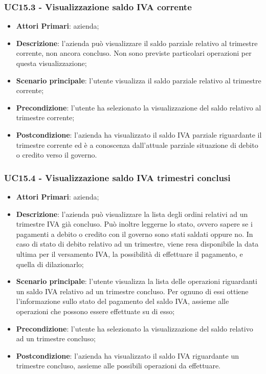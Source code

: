 \subsubsection{UC15.3 - Visualizzazione saldo IVA corrente}
\begin{itemize}
	\item \textbf{Attori Primari}: azienda;
	\item \textbf{Descrizione}: l'azienda può visualizzare il saldo parziale relativo al trimestre corrente, non ancora concluso. Non sono previste particolari operazioni per questa visualizzazione;
	\item \textbf{Scenario principale}: l'utente visualizza il saldo parziale relativo al trimestre corrente;
	\item \textbf{Precondizione}: l'utente ha selezionato la visualizzazione del saldo relativo al trimestre corrente;
	\item \textbf{Postcondizione}: l'azienda ha visualizzato il saldo IVA parziale riguardante il trimestre corrente ed è a conoscenza dall'attuale parziale situazione di debito o credito verso il governo.
\end{itemize} 

\subsubsection{UC15.4 - Visualizzazione saldo IVA trimestri conclusi}
\begin{itemize}
	\item \textbf{Attori Primari}: azienda;
	\item \textbf{Descrizione}: l'azienda può visualizzare la lista degli ordini relativi ad un trimestre IVA già concluso. Può inoltre leggerne lo stato, ovvero sapere se i pagamenti a debito o credito con il governo sono stati saldati oppure no. In caso di stato di debito relativo ad un trimestre, viene resa disponibile la data ultima per il versamento IVA, la possibilità di effettuare il pagamento, e quella di dilazionarlo;
	\item \textbf{Scenario principale}: l'utente visualizza la lista delle operazioni riguardanti  un saldo IVA relativo ad un trimestre concluso. Per ognuno di essi ottiene l'informazione sullo stato del pagamento del saldo IVA, assieme alle operazioni che possono essere effettuate su di esso;
	\item \textbf{Precondizione}: l'utente ha selezionato la visualizzazione del saldo relativo ad un trimestre concluso;
	\item \textbf{Postcondizione}: l'azienda ha visualizzato il saldo IVA riguardante un trimestre concluso, assieme alle possibili operazioni da effettuare.
\end{itemize} 

